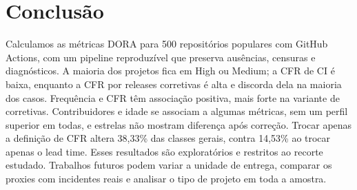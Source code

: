 \section{Conclusão}
\label{sec:conclusao}
Calculamos as métricas DORA para 500 repositórios populares com GitHub
Actions, com um pipeline reproduzível que preserva ausências, censuras e
diagnósticos. A maioria dos projetos fica em High ou Medium; a CFR de CI é
baixa, enquanto a CFR por releases corretivas é alta e discorda dela na
maioria dos casos. Frequência e CFR têm associação positiva, mais forte na
variante de corretivas. Contribuidores e idade se associam a algumas métricas,
sem um perfil superior em todas, e estrelas não mostram diferença após
correção. Trocar apenas a definição de CFR altera 38,33\% das classes gerais,
contra 14,53\% ao trocar apenas o lead time. Esses resultados são
exploratórios e restritos ao recorte estudado. Trabalhos futuros podem variar
a unidade de entrega, comparar os proxies com incidentes reais e analisar o
tipo de projeto em toda a amostra.
